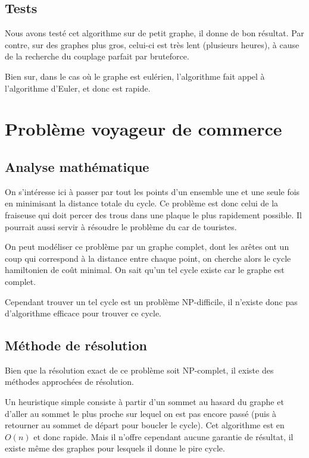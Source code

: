 \documentclass{scrartcl}
\begin{document}
  \subsection{Tests}
    Nous avons testé cet algorithme sur de petit graphe, il donne de bon
    résultat. Par contre, sur des graphes plus gros, celui-ci est très lent
    (plusieurs heures), à cause de la recherche du couplage parfait par
    bruteforce.

    Bien sur, dans le cas où le graphe est eulérien, l'algorithme fait appel
    à l'algorithme d'Euler, et donc est rapide.

\section{Problème voyageur de commerce} \label{sec:tsp}
  \subsection{Analyse mathématique}
    On s'intéresse ici à passer par tout les points d'un ensemble une et une
    seule fois en minimisant la distance totale du cycle. Ce problème est donc
    celui de la fraiseuse qui doit percer des trous dans une plaque le plus
    rapidement possible. Il pourrait aussi servir à résoudre le problème du car
    de touristes.

    On peut modéliser ce problème par un graphe complet, dont les arêtes ont un
    coup qui correspond à la distance entre chaque point, on cherche alors le
    cycle hamiltonien de coût minimal. On sait qu'un tel cycle existe car le
    graphe est complet.

    Cependant trouver un tel cycle est un problème NP-difficile, il n'existe
    donc pas d'algorithme efficace pour trouver ce cycle.

  \subsection{Méthode de résolution}
    Bien que la résolution exact de ce problème soit NP-complet, il existe des
    méthodes approchées de résolution.

    Un heuristique simple consiste à partir d'un sommet au hasard du graphe et
    d'aller au sommet le plus proche sur lequel on est pas encore passé (puis
    à retourner au sommet de départ pour boucler le cycle). Cet algorithme est
    en $O(n)$ et donc rapide. Mais il n'offre cependant aucune garantie de
    résultat, il existe même des graphes pour lesquels il donne le pire cycle.
\end{document}
